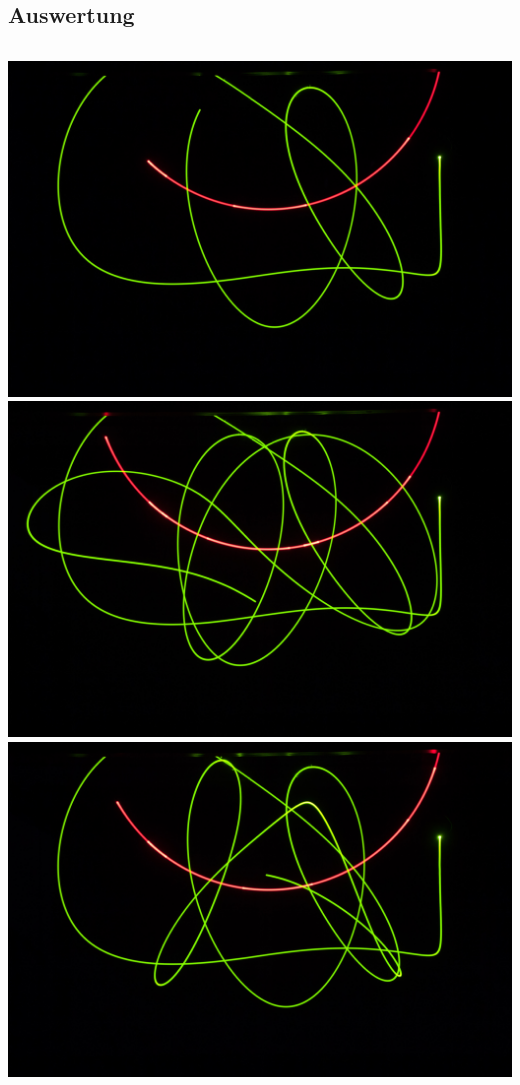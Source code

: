 \subsection{Auswertung}
\begin{frame}
	\begin{columns}
	\includegraphics[width=\textwidth]{images/4/pendel-3}\\
	\includegraphics[width=\textwidth]{images/4/pendel-7}
	\includegraphics[width=\textwidth]{images/4/pendel-8}\\

\end{columns}
\end{frame}
